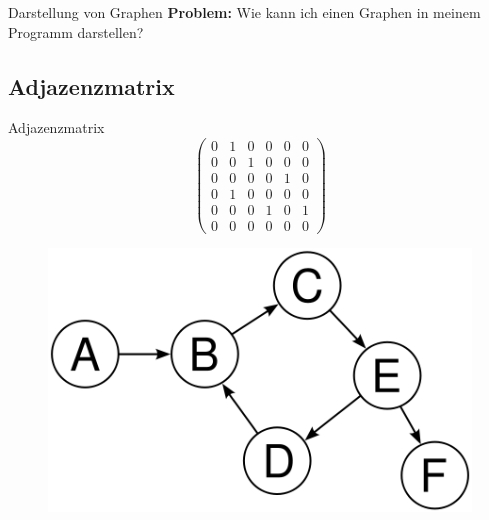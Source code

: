 \documentclass[18pt]{beamer}
\begin{document}
\begin{frame}{Darstellung von Graphen}
    \textbf{Problem:} Wie kann ich einen Graphen in meinem Programm darstellen?
\end{frame}


\subsection{Adjazenzmatrix}

\begin{frame}{Adjazenzmatrix}
    \[
    \left(
    \begin{array}{cccccc}
        0 & 1 & 0 & 0 & 0 & 0 \\
        0 & 0 & 1 & 0 & 0 & 0 \\
        0 & 0 & 0 & 0 & 1 & 0 \\
        0 & 1 & 0 & 0 & 0 & 0 \\
        0 & 0 & 0 & 1 & 0 & 1 \\
        0 & 0 & 0 & 0 & 0 & 0
    \end{array}
    \right)
    \]

    \begin{figure}
        \includegraphics[scale=.3]{img/graph.png}
    \end{figure}

\end{frame}
\end{document}
